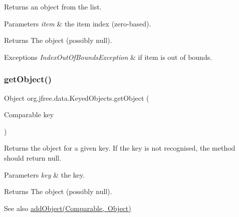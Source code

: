 Returns an object from the list.


\begin{DoxyParams}{Parameters}
{\em item} & the item index (zero-\/based).\\
\hline
\end{DoxyParams}
\begin{DoxyReturn}{Returns}
The object (possibly {\ttfamily null}).
\end{DoxyReturn}

\begin{DoxyExceptions}{Exceptions}
{\em Index\+Out\+Of\+Bounds\+Exception} & if {\ttfamily item} is out of bounds. \\
\hline
\end{DoxyExceptions}
\mbox{\label{classorg_1_1jfree_1_1data_1_1_keyed_objects_aad4f61f3e7f311960cf0064b8d304155}} 
\subsubsection{\texorpdfstring{get\+Object()}{getObject()}\hspace{0.1cm}{\footnotesize\ttfamily [2/2]}}
{\footnotesize\ttfamily Object org.\+jfree.\+data.\+Keyed\+Objects.\+get\+Object (\begin{DoxyParamCaption}\item[{Comparable}]{key }\end{DoxyParamCaption})}

Returns the object for a given key. If the key is not recognised, the method should return {\ttfamily null}.


\begin{DoxyParams}{Parameters}
{\em key} & the key.\\
\hline
\end{DoxyParams}
\begin{DoxyReturn}{Returns}
The object (possibly {\ttfamily null}).
\end{DoxyReturn}
\begin{DoxySeeAlso}{See also}
\mbox{\hyperlink{classorg_1_1jfree_1_1data_1_1_keyed_objects_a6a48961294a54e5a2d1c64489ab52cf6}{add\+Object(\+Comparable, Object)}} 
\end{DoxySeeAlso}
\mbox{\label{classorg_1_1jfree_1_1data_1_1_keyed_objects_a394658c975b404e9527f90ed2c352176}} 
